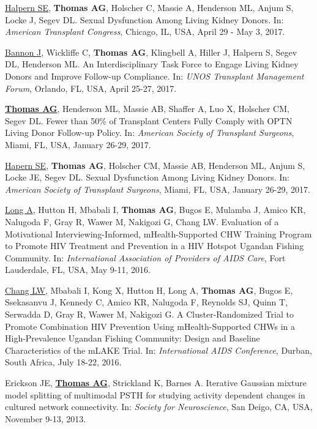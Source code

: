 \documentclass[10pt]{article}
\begin{document}
\begin{bibenum}
\item \underline{Halpern SE}, \textbf{Thomas AG}, Holscher C, Massie A,
  Henderson ML, Anjum S, Locke J, Segev DL.
  Sexual Dysfunction Among Living Kidney Donors.
  In: \emph{American Transplant Congress},
  Chicago, IL, USA, April 29 - May 3, 2017.

\item \underline{Bannon J}, Wickliffe C, \textbf{Thomas AG}, Klingbell A,
  Hiller J, Halpern S, Segev DL, Henderson ML.
  An Interdisciplinary Task Force to Engage Living Kidney
  Donors and Improve Follow-up Compliance.
  In: \emph{UNOS Transplant Management Forum},
  Orlando, FL, USA, April 25-27, 2017.

\item \underline{\textbf{Thomas AG}}, Henderson ML, Massie AB, Shaffer A,
  Luo X, Holscher CM, Segev DL. Fewer than 50\% of Transplant Centers Fully
  Comply with OPTN Living Donor Follow-up Policy.
  In: \emph{American Society of Transplant Surgeons},
  Miami, FL, USA, January 26-29, 2017.

\item \underline{Hapern SE}, \textbf{Thomas AG}, Holscher CM, Massie AB,
  Henderson ML, Anjum S, Locke JE, Segev DL.
  Sexual Dysfunction Among Living Kidney Donors.
  In: \emph{American Society of Transplant Surgeons},
  Miami, FL, USA, January 26-29, 2017.

\item \underline{Long A}, Hutton H, Mbabali I, \textbf{Thomas AG}, Bugos E, Mulamba J,
  Amico KR, Nalugoda F, Gray R, Wawer M, Nakigozi G, Chang LW.
  Evaluation of a Motivational Interviewing-Informed, mHealth-Supported
  CHW Training Program to Promote HIV Treatment and Prevention in a HIV
  Hotspot Ugandan Fishing Community. In:
  \emph{International Association of Providers of AIDS Care},
  Fort Lauderdale, FL, USA, May 9-11, 2016.

\item \underline{Chang LW}, Mbabali I, Kong X, Hutton H, Long A,
  \textbf{Thomas AG}, Bugos E, Ssekasanvu J, Kennedy C, Amico KR,
  Nalugoda F, Reynolds SJ, Quinn T, Serwadda D, Gray R, Wawer M, Nakigozi G.
  A Cluster-Randomized Trial to Promote Combination HIV Prevention
  Using mHealth-Supported CHWs in a High-Prevalence Ugandan Fishing
  Community: Design and Baseline Characteristics of the
  mLAKE Trial. In: \emph{International AIDS Conference},
  Durban, South Africa, July 18-22, 2016.

\item Erickson JE\dag, \underline{\textbf{Thomas AG}\dag}, Strickland K, Barnes A.
  Iterative Gaussian mixture model splitting
  of multimodal PSTH for studying activity dependent changes in
  cultured network connectivity. In: \emph{Society for Neuroscience},
  San Deigo, CA, USA, November 9-13, 2013.

\end{bibenum}
\end{document}
